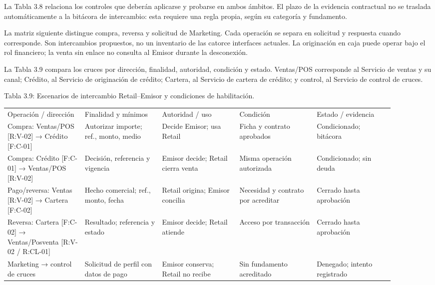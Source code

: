 \documentclass[11pt]{article}
\begin{document}
{La Tabla 3.8 relaciona los controles que deberán aplicarse y probarse en ambos ámbitos. El plazo de la evidencia contractual no se traslada automáticamente a la bitácora de intercambio: esta requiere una regla propia, según su categoría y fundamento.}

{La matriz siguiente distingue compra, reversa y solicitud de Marketing. Cada operación se separa en solicitud y respuesta cuando corresponde. Son intercambios propuestos, no un inventario de las catorce interfaces actuales. La originación en caja puede operar bajo el rol financiero; la venta sin enlace no consulta al Emisor durante la desconexión.}

{La Tabla 3.9 compara los cruces por dirección, finalidad, autoridad, condición y estado. Ventas/POS corresponde al Servicio de ventas y su canal; Crédito, al Servicio de originación de crédito; Cartera, al Servicio de cartera de crédito; y control, al Servicio de control de cruces.}

Tabla 3.9: Escenarios de intercambio Retail--Emisor y condiciones de habilitación.


\begin{longtable}{@{}p{0.18\linewidth}p{0.18\linewidth}p{0.18\linewidth}p{0.18\linewidth}p{0.18\linewidth}@{}}
\toprule\noalign{}
\endhead
\bottomrule\noalign{}
\endlastfoot
{Operación / dirección} & {Finalidad y mínimos} & {Autoridad / uso} & {Condición} & {Estado / evidencia} \\
{Compra: Ventas/POS {[}R:V-02{]} → Crédito {[}F:C-01{]}} & {Autorizar importe; ref., monto, medio} & {Decide Emisor; usa Retail} & {Ficha y contrato aprobados} & {Condicionado; bitácora} \\
{Compra: Crédito {[}F:C-01{]} → Ventas/POS {[}R:V-02{]}} & {Decisión, referencia y vigencia} & {Emisor decide; Retail cierra venta} & {Misma operación autorizada} & {Condicionado; sin deuda} \\
{Pago/reversa: Ventas {[}R:V-02{]} → Cartera {[}F:C-02{]}} & {Hecho comercial; ref., monto, fecha} & {Retail origina; Emisor concilia} & {Necesidad y contrato por acreditar} & {Cerrado hasta aprobación} \\
{Reversa: Cartera {[}F:C-02{]} → Ventas/Posventa {[}R:V-02 / R:CL-01{]}} & {Resultado; referencia y estado} & {Emisor decide; Retail atiende} & {Acceso por transacción} & {Cerrado hasta aprobación} \\
{Marketing → control de cruces} & {Solicitud de perfil con datos de pago} & {Emisor conserva; Retail no recibe} & {Sin fundamento acreditado} & {Denegado; intento registrado} \\
\end{longtable}
\end{document}
